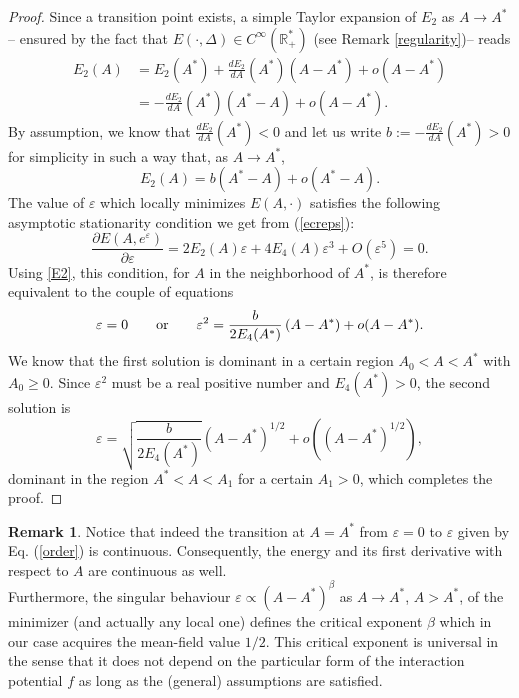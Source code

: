 \documentclass[12pt]{interact}
\theoremstyle{definition}
\newtheorem{remark}[thm]{Remark}
\newcommand{\R}{\mathbb R}
\begin{document}
\begin{proof}
Since a transition point exists, a simple Taylor expansion of $E_2$ as $A\to A^*$ -- ensured by the fact that $E(\cdot,\Delta)\in C^\infty(\R_+^*)$ (see Remark \ref{regularity})-- reads
\begin{align*}
E_2(A)&=E_2(A^*)+\frac{d E_2}{d A}(A^*)(A-A^*)+o(A-A^*)\\
&=-\frac{d E_2}{d A}(A^*)(A^*-A)+o(A-A^*).
\end{align*}
By assumption, we know that $\frac{d E_2}{d A}(A^*)<0$ and let us write $b:=-\frac{d E_2}{d A}(A^*)>0$ for simplicity in such a way that, as $A\to A^*$,
\begin{equation}\label{E2}
E_2(A)=b(A^*-A)+o(A^*-A).
\end{equation}
The value of $\varepsilon$ which locally minimizes $E(A,\cdot)$ satisfies the following asymptotic stationarity condition we get from (\ref{ecreps}):
\begin{equation}\label{crit}
\frac{\partial E(A,e^\varepsilon)}{\partial \varepsilon}
= 2 E_2(A) \varepsilon + 4 E_4(A) \varepsilon^3 + O(\varepsilon^5) = 0 .    
\end{equation}
Using \eqref{E2}, this condition, for $A$ in the neighborhood of $A^*$, is therefore equivalent to the couple of equations
\begin{equation}
\varepsilon = 0 \qquad \textnormal{or} \qquad \varepsilon^2 =
\frac{b}{2 E_4(A^*)} \left( A - A^* \right) +o(A-A^*) .
\end{equation}  
We know that the first solution is dominant in a certain region
$A_0<A<A^*$ with $A_0\ge 0$.
Since $\varepsilon^2$ must be a real positive number and $E_4(A^*)>0$,
the second solution is
\begin{equation} \label{order}
\varepsilon= \sqrt{\frac{b}{2 E_4(A^*)}}
\left( A - A^* \right)^{1/2} +o(\left( A - A^* \right)^{1/2}) ,
\end{equation}  
dominant in the region $A^*<A<A_1$ for a certain $A_1>0$,
which completes the proof.
\end{proof}
\begin{remark}
Notice that indeed the transition at $A=A^*$ from $\varepsilon=0$
to $\varepsilon$ given by Eq. (\ref{order}) is continuous.
Consequently, the energy and its first derivative with respect to $A$ are
continuous as well.\\
Furthermore, the singular behaviour $\varepsilon\propto(A-A^*)^{\beta}$
as $A\to A^*$, $A>A^*$, of the minimizer (and actually any local one) defines the critical exponent $\beta$
which in our case acquires the mean-field value $1/2$.
This critical exponent is universal in the sense that it does not depend on
the particular form of the interaction potential $f$ as long as the (general) assumptions are satisfied.
\end{remark}
\end{document}
